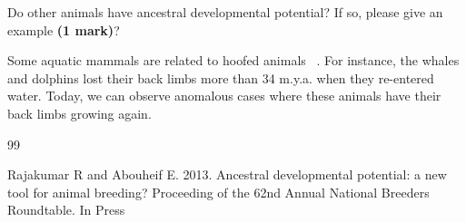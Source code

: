 \documentclass[letterpaper,12pt]{article}
\newenvironment{myindentpar}[1]%
{\begin{list}{}%
          {\setlength{\leftmargin}{#1}}%
          \item[]%
}
{\end{list}}
\begin{document}
Do other animals have ancestral developmental potential? If so, please give an example \textbf{(1 mark)}?
\vspace*{10px}

\begin{myindentpar}{0.5cm}
Some aquatic mammals are related to hoofed animals ~\cite{Rajakumar}. For instance, the whales and dolphins lost their back limbs more than 34 m.y.a. when they re-entered water. Today, we can observe anomalous cases where these animals have their back limbs growing again.
\end{myindentpar}


\begin{thebibliography}{99}

Rajakumar R and Abouheif E. 2013. Ancestral developmental potential: a new tool for animal breeding? Proceeding of the 62nd Annual National Breeders Roundtable. In Press

\end{thebibliography}
\end{document}
